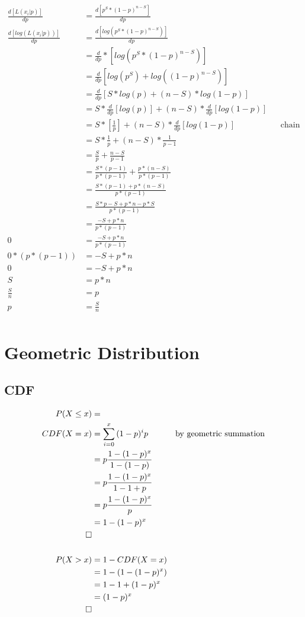 \documentclass[]{article}
\begin{document}
 \begin{align}
	 \frac{d[L(x_i|p)]}{dp} &=\frac{d[p^S*(1-p)^{n-S}]}{dp}\\
	 \frac{d[log(L(x_i|p))]}{dp} &=\frac{d[log(p^S*(1-p)^{n-S})]}{dp}\\
	 &= \frac{d}{dp}*[log(p^S*(1-p)^{n-S})]\\
	 &= \frac{d}{dp}[log(p^S)+log((1-p)^{n-S})]\\
	 &= \frac{d}{dp}[S*log(p)+(n-S)*log(1-p)]\\
	 &= S*\frac{d}{dp}[log(p)]+(n-S)*\frac{d}{dp}[log(1-p)]\\
	 &= S*[\frac{1}{p}]+(n-S)*\frac{d}{dp}[log(1-p)] && \text{chain rule}\\
	 &= S*\frac{1}{p}+(n-S)*\frac{1}{p-1}\\
 	 &= \frac{S}{p}+\frac{n-S}{p-1}\\
 	 &= \frac{S*(p-1)}{p*(p-1)}+\frac{p*(n-S)}{p*(p-1)}\\
 	 &= \frac{S*(p-1)+p*(n-S)}{p*(p-1)}\\
 	 &= \frac{S*p-S+p*n-p*S}{p*(p-1)}\\
 	 &= \frac{-S+p*n}{p*(p-1)}\\
 	 0 &= \frac{-S+p*n}{p*(p-1)}\\
  	 0*(p*(p-1)) &= -S+p*n\\
  	 0 &= -S+p*n\\
 	 S &= p*n\\
 	 \frac{S}{n} &= p\\
  	 p &= \frac{S}{n}\\
 \end{align}
 
\section {Geometric Distribution}

\subsection {CDF}

\begin{align*}
	P(X \le x) &=\\
	CDF(X=x) &= \sum_{i=0}^{x}{(1-p)^ip} &\text{by geometric summation}\\
	&= p\frac{1-(1-p)^x}{1-(1-p)}\\
	&= p\frac{1-(1-p)^x}{1-1+p}\\
	&= p\frac{1-(1-p)^x}{p}\\	
	&= 1-(1-p)^x\\	
	\qed\\
	\\
	P(X > x) &= 1 - CDF(X=x)\\
	&= 1 - (1-(1-p)^x)\\
	&= 1 - 1 +(1-p)^x\\	
	&= (1-p)^x\\	
	\qed
\end{align*}
\end{document}
